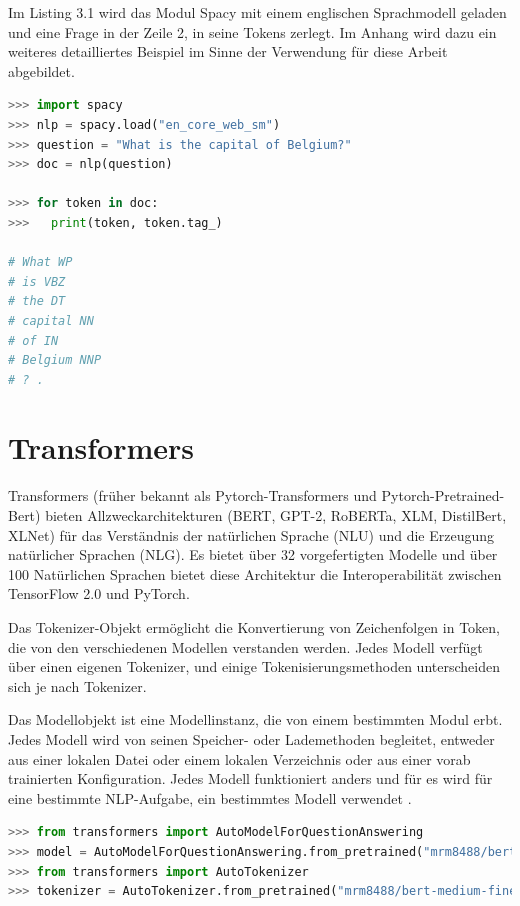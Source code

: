 \documentclass[
        ngerman,
        paper=a4,
        numbers=noendperiod,
]{scrreprt}
\begin{document}
Im Listing 3.1 wird das Modul Spacy mit einem englischen Sprachmodell geladen und eine Frage in der Zeile 2, in seine Tokens zerlegt. Im Anhang wird dazu ein weiteres detailliertes Beispiel im Sinne der Verwendung für diese Arbeit abgebildet.

\begin{lstlisting}[language=Python, caption=Spacy Beispiel]
>>> import spacy
>>> nlp = spacy.load("en_core_web_sm")
>>> question = "What is the capital of Belgium?"
>>> doc = nlp(question)

>>> for token in doc:
>>>   print(token, token.tag_)

# What WP                                    
# is VBZ                                     
# the DT                                     
# capital NN            
# of IN
# Belgium NNP
# ? .

\end{lstlisting}

\section{Transformers}
Transformers (früher bekannt als Pytorch-Transformers und Pytorch-Pretrained-Bert) bieten Allzweckarchitekturen (BERT, GPT-2, RoBERTa, XLM, DistilBert, XLNet) für das Verständnis der natürlichen Sprache (NLU) und die Erzeugung natürlicher Sprachen (NLG). Es bietet über 32 vorgefertigten Modelle und über 100 Natürlichen Sprachen bietet diese Architektur die Interoperabilität zwischen TensorFlow 2.0 und PyTorch.

Das Tokenizer-Objekt ermöglicht die Konvertierung von Zeichenfolgen in Token, die von den verschiedenen Modellen verstanden werden. Jedes Modell verfügt über einen eigenen Tokenizer, und einige Tokenisierungsmethoden unterscheiden sich je nach Tokenizer.

Das Modellobjekt ist eine Modellinstanz, die von einem bestimmten Modul erbt. Jedes Modell wird von seinen Speicher- oder Lademethoden begleitet, entweder aus einer lokalen Datei oder einem lokalen Verzeichnis oder aus einer vorab trainierten Konfiguration. Jedes Modell funktioniert anders und für es wird für eine bestimmte NLP-Aufgabe, ein bestimmtes Modell verwendet \citep{TransformersDocumentation}\citep{PyTorch-TransformersPyTorch}.

\begin{lstlisting}[language=Python, caption=Transformers Beispiel]
>>> from transformers import AutoModelForQuestionAnswering
>>> model = AutoModelForQuestionAnswering.from_pretrained("mrm8488/bert-medium-finetuned-squadv2")
>>> from transformers import AutoTokenizer
>>> tokenizer = AutoTokenizer.from_pretrained("mrm8488/bert-medium-finetuned-squadv2")
\end{lstlisting}
\end{document}
